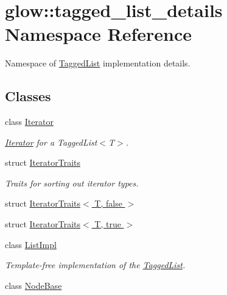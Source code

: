 \hypertarget{namespaceglow_1_1tagged__list__details}{}\section{glow\+:\+:tagged\+\_\+list\+\_\+details Namespace Reference}
\label{namespaceglow_1_1tagged__list__details}


Namespace of \hyperlink{classglow_1_1_tagged_list}{Tagged\+List} implementation details.  


\subsection*{Classes}
\begin{DoxyCompactItemize}
\item 
class \hyperlink{classglow_1_1tagged__list__details_1_1_iterator}{Iterator}
\begin{DoxyCompactList}\small\item\em \hyperlink{classglow_1_1tagged__list__details_1_1_iterator}{Iterator} for a Tagged\+List$<$\+T$>$. \end{DoxyCompactList}\item 
struct \hyperlink{structglow_1_1tagged__list__details_1_1_iterator_traits}{Iterator\+Traits}
\begin{DoxyCompactList}\small\item\em Traits for sorting out iterator types. \end{DoxyCompactList}\item 
struct \hyperlink{structglow_1_1tagged__list__details_1_1_iterator_traits_3_01_t_00_01false_01_4}{Iterator\+Traits$<$ T, false $>$}
\item 
struct \hyperlink{structglow_1_1tagged__list__details_1_1_iterator_traits_3_01_t_00_01true_01_4}{Iterator\+Traits$<$ T, true $>$}
\item 
class \hyperlink{classglow_1_1tagged__list__details_1_1_list_impl}{List\+Impl}
\begin{DoxyCompactList}\small\item\em Template-\/free implementation of the {\ttfamily \hyperlink{classglow_1_1_tagged_list}{Tagged\+List}}. \end{DoxyCompactList}\item 
class \hyperlink{classglow_1_1tagged__list__details_1_1_node_base}{Node\+Base}
\end{DoxyCompactItemize}
